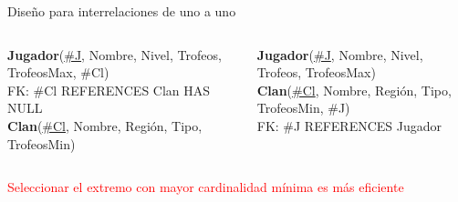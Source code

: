 \begin{frame}{Dise\~no para interrelaciones de uno a uno}

    \begin{columns}[T]
        \begin{column}{0.5\linewidth}
            \begin{scriptsize}
                
                \textbf{Jugador}(\underline{\#J}, Nombre, Nivel, Trofeos, TrofeosMax, \#Cl)\\[1mm]
                \hspace{4mm} FK: \#Cl REFERENCES Clan HAS NULL\\[2mm]
                \textbf{Clan}(\underline{\#Cl}, Nombre, Regi\'on, Tipo, TrofeosMin)\\[2mm]
            \end{scriptsize}
        \end{column}

        \begin{column}{0.48\linewidth}
            \begin{scriptsize}
                
                \textbf{Jugador}(\underline{\#J}, Nombre, Nivel, Trofeos, TrofeosMax)\\[1mm]
                \textbf{Clan}(\underline{\#Cl}, Nombre, Regi\'on, Tipo, TrofeosMin, \#J)\\[1mm]
                \hspace{4mm} FK: \#J REFERENCES Jugador\\[2mm]
            \end{scriptsize}
        \end{column}
        
    \end{columns}
    
    \vspace{5mm}

    \centering
    \large \textcolor{red}{Seleccionar el extremo con mayor cardinalidad m\'inima es m\'as eficiente}
    

\end{frame}


